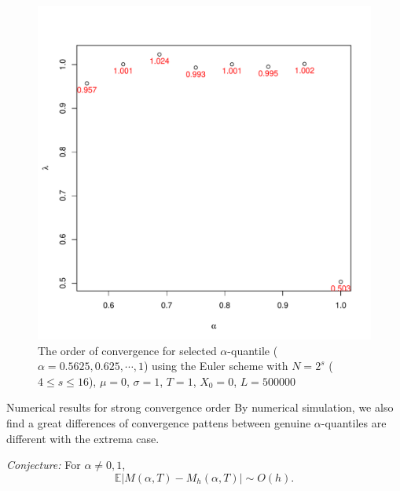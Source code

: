 \documentclass[cjk]{beamer}
\begin{document}
\begin{frame}
\begin{figure}
   \centering
   \includegraphics[scale=0.4]{nout_0rato.pdf} %
   \caption{The order of convergence for selected $\alpha$-quantile ($\alpha = 0.5625, 0.625,  \cdots, 1$) using the Euler scheme with $N = 2^s$ ($4\le s \le 16$), $\mu=0$, $\sigma=1$, $T=1$, $X_0=0$, $L=500000$}
   \label{f:rate}
\end{figure}
\end{frame}


\begin{frame}{Numerical results for strong convergence order}
By numerical simulation, we also find a great differences of convergence pattens 
between genuine $\alpha$-quantiles are different
with the extrema case. 

\vspace{2em}
{\color{red}\em Conjecture:} For $\alpha\neq 0,1$, 
\[
\mathbb{E} |M(\alpha, T) - M_h(\alpha,T)|\sim O(h).
\]
\end{frame}
\end{document}
